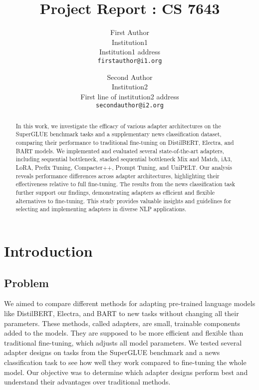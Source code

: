 \documentclass[10pt,twocolumn,letterpaper]{article}
\begin{document}
\title{Project Report : CS 7643}

\author{First Author\\
Institution1\\
Institution1 address\\
{\tt\small firstauthor@i1.org}
\and
Second Author\\
Institution2\\
First line of institution2 address\\
{\tt\small secondauthor@i2.org}
}
\maketitle

\begin{abstract}
   In this work, we investigate the efficacy of various adapter architectures on the SuperGLUE benchmark tasks and a supplementary news classification dataset, comparing their performance to traditional fine-tuning on DistilBERT, Electra, and BART models. We implemented and evaluated several state-of-the-art adapters, including sequential bottleneck, stacked sequential bottleneck Mix and Match, iA3, LoRA, Prefix Tuning, Compacter++, Prompt Tuning, and UniPELT. Our analysis reveals performance differences across adapter architectures, highlighting their effectiveness relative to full fine-tuning. The results from the news classification task further support our findings, demonstrating adapters as efficient and flexible alternatives to fine-tuning. This study provides valuable insights and guidelines for selecting and implementing adapters in diverse NLP applications.
\end{abstract}

\section{Introduction}
\subsection{Problem}
We aimed to compare different methods for adapting pre-trained language models like DistilBERT, Electra, and BART to new tasks without changing all their parameters. These methods, called adapters, are small, trainable components added to the models. They are supposed to be more efficient and flexible than traditional fine-tuning, which adjusts all model parameters. We tested several adapter designs on tasks from the SuperGLUE benchmark and a news classification task to see how well they work compared to fine-tuning the whole model. Our objective was to determine which adapter designs perform best and understand their advantages over traditional methods.
\end{document}
